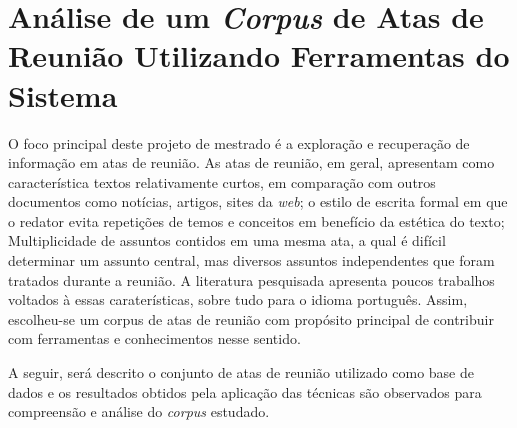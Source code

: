 



\section{Análise de um \textit{Corpus} de Atas de Reunião Utilizando Ferramentas do Sistema}	
\label{sec:aplicacao-sistema}

O foco principal deste projeto de mestrado é a exploração e recuperação de informação em atas de reunião. 
% 
As atas de reunião, em geral, apresentam como característica textos relativamente curtos, em comparação com outros documentos como notícias, artigos, sites da \textit{web}; o estilo de escrita formal em que o redator evita repetições de temos e conceitos em benefício da estética do texto; Multiplicidade de assuntos contidos em uma mesma ata, a qual é difícil determinar um assunto central, mas diversos assuntos independentes que foram tratados durante a reunião.
A literatura pesquisada apresenta poucos trabalhos voltados à essas caraterísticas, sobre tudo para o idioma português. Assim, escolheu-se um corpus de atas de reunião com propósito principal de contribuir com ferramentas e conhecimentos nesse sentido. 



A seguir, será descrito o conjunto de atas de reunião utilizado como base de dados e os resultados obtidos pela aplicação das técnicas são observados para compreensão e análise do \textit{corpus} estudado.




